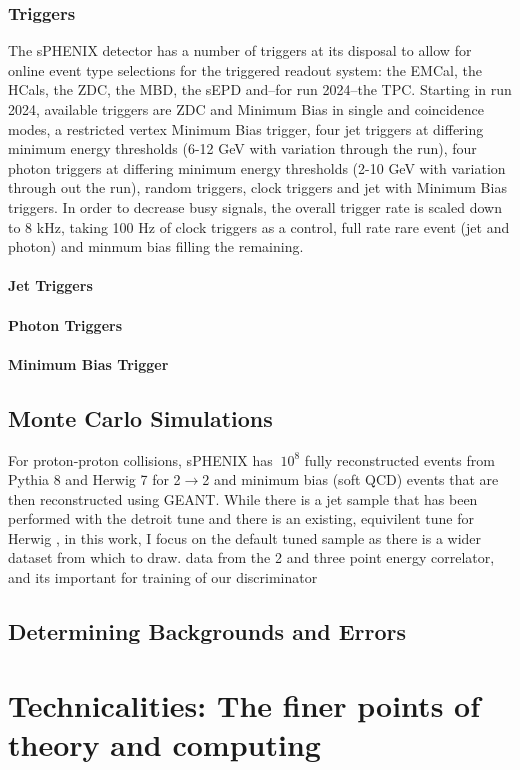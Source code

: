 \documentclass[letterpaper, 12pt, oneside]{book}
\theoremstyle{definition}
\begin{document}
\section{Triggers}
	The sPHENIX detector has a number of triggers at its disposal to allow for online event type selections for the triggered readout system: the EMCal, the HCals, the ZDC, the MBD, the sEPD and--for run 2024--the TPC.
	Starting in run 2024, available triggers are ZDC and Minimum Bias in single and coincidence modes, a restricted vertex Minimum Bias trigger, four jet triggers at differing minimum energy thresholds (6-12 GeV with variation through the run), four photon triggers at differing minimum energy thresholds (2-10 GeV with variation through out the run), random triggers, clock triggers and jet with Minimum Bias triggers. 
	In order to decrease busy signals, the overall trigger rate is scaled down to 8 kHz, taking 100 Hz of clock triggers as a control, full rate rare event (jet and photon) and minmum bias filling the remaining. 
	\subsection{Jet Triggers}
	\subsection{Photon Triggers}
	\subsection{Minimum Bias Trigger}
\chapter{Monte Carlo Simulations}
	For proton-proton collisions, sPHENIX has $~10^8$ fully reconstructed events from Pythia 8 and Herwig 7 for 2$\rightarrow$2 and minimum bias (soft QCD) events that are then reconstructed using GEANT. 
	While there is a jet sample that has been performed with the detroit tune \cite{Detroit_tune} and there is an existing, equivilent tune for Herwig \cite{New_Haven_Vanderbilt_tune}, in this work, I focus on the default tuned sample as there is a wider dataset from which to draw. 
	data from the 2 and three point energy correlator, and its important for training of our discriminator 
\chapter{Determining Backgrounds and Errors}
\part{Technicalities: The finer points of theory and computing}
\end{document}
